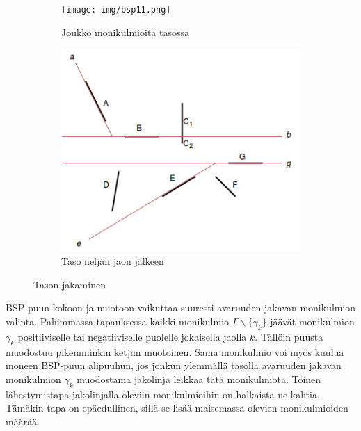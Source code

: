 \documentclass[a4paper, 12pt, titlepage]{article}
\begin{document}
\begin{figure}[htp]
 \centering
 \begin{subfigure}{0.5\textwidth} 
  \centering
  \texttt{[image: img/bsp11.png]}
  \vspace{0.75cm}
  \caption{Joukko monikulmioita tasossa}
  \label{bsp11}
 \end{subfigure}%
 \begin{subfigure}{0.5\textwidth} 
  \centering
  \includegraphics[width=0.9\linewidth]{img/bsp12.png}
  \caption{Taso neljän jaon jälkeen}
  \label{bsp12}
 \end{subfigure}
 \caption{Tason jakaminen}
 \vspace{-0.5cm}
 \label{bsp1}
\end{figure}


BSP-puun kokoon ja muotoon vaikuttaa suuresti avaruuden jakavan monikulmion valinta. Pahimmassa tapauksessa kaikki monikulmio $\Gamma\backslash\{\gamma_k\}$ jäävät monikulmion $\gamma_k$ positiiviselle tai negatiiviselle puolelle jokaisella jaolla $k$. Tällöin puusta muodostuu pikemminkin ketjun muotoinen. Sama monikulmio voi myös kuulua moneen BSP-puun alipuuhun, jos jonkun ylemmällä tasolla avaruuden jakavan monikulmion $\gamma_k$ muodostama jakolinja leikkaa tätä monikulmiota. \citep[.]{samet} Toinen lähestymistapa jakolinjalla oleviin monikulmioihin on halkaista ne kahtia. Tämäkin tapa on epäedullinen, sillä se lisää maisemassa olevien monikulmioiden määrää. \citep[.]{ranta}\\ %
\end{document}

